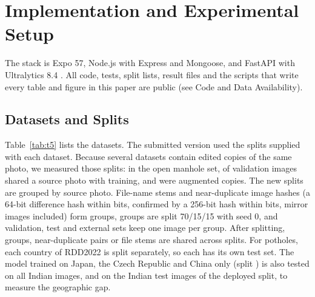 \documentclass{ieeeaccess}
\begin{document}
\section{Implementation and Experimental Setup}\label{sec:impl}

The stack is Expo 57, Node.js with Express and Mongoose, and FastAPI with Ultralytics 8.4 \cite{b11}. All code, tests, split lists, result files and the scripts that write every table and figure in this paper are public (see Code and Data Availability).

\subsection{Datasets and Splits}

Table~\ref{tab:t5} lists the datasets. The submitted version used the splits supplied with each dataset. Because several datasets contain edited copies of the same photo, we measured those splits: in the open manhole set, \nOldManholeLeak{} of \nOldManholeVal{} validation images shared a source photo with training, and \nOldManholeCopies{} were augmented copies. The new splits are grouped by source photo. File-name stems and near-duplicate image hashes (a 64-bit difference hash within \nHammingSixtyfour{} bits, confirmed by a 256-bit hash within \nHammingTwofivesix{} bits, mirror images included) form groups, groups are split 70/15/15 with seed 0, and validation, test and external sets keep one image per group. After splitting, \nSplitSharedGroups{} groups, near-duplicate pairs or file stems are shared across splits. For potholes, each country of RDD2022 is split separately, so each has its own test set. The model trained on Japan, the Czech Republic and China only (split \nPotholeNoIndiaSplit) is also tested on all \nExtIndiaAll{} Indian images, and on the \nExtIndiaTest{} Indian test images of the deployed split, to measure the geographic gap.
\end{document}
